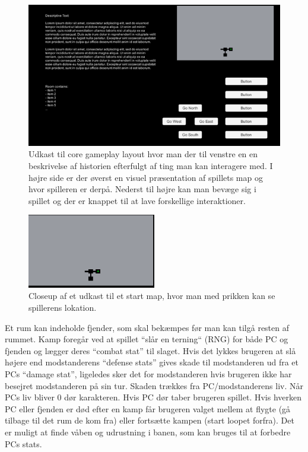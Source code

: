 \begin{figure}[H]
\centering
\includegraphics[width = \textwidth]{02-Body/Images/SpilLayout-udkast.png}
\caption{Udkast til core gameplay layout hvor man der til venstre en en beskrivelse af historien efterfulgt af ting man kan interagere med. I højre side er der øverst en visuel præsentation af spillets map og hvor spilleren er derpå. Nederst til højre kan man bevæge sig i spillet og der er knappet til at lave forskellige interaktioner.}
\label{fig:Core-Gameplay-Layout-udkast}
\end{figure}

\begin{figure}[H]
\centering
\includegraphics[width = 0.5\textwidth]{02-Body/Images/Map-closeup.png}
\caption{Closeup af et udkast til et start map, hvor man med prikken kan se spillerens lokation.}
\label{fig:Map-Layout-udkast}
\end{figure}

Et rum kan indeholde fjender, som skal bekæmpes før man kan tilgå resten af rummet. Kamp foregår ved at spillet “slår en terning“ (RNG) for både PC og fjenden og lægger deres “combat stat” til slaget. Hvis det lykkes brugeren at slå højere end modstanderens ``defense stats'' gives skade til modstanderen ud fra et PCs ``damage stat'', ligeledes sker det for modstanderen hvis brugeren ikke har besejret modstanderen på sin tur. Skaden trækkes fra PC/modstanderens liv. Når PCs liv bliver 0 dør karakteren. Hvis PC dør taber brugeren spillet. Hvis hverken PC eller fjenden er død efter en kamp får brugeren valget mellem at flygte (gå tilbage til det rum de kom fra) eller fortsætte kampen (start loopet forfra). 
Det er muligt at finde våben og udrustning i banen, som kan bruges til at forbedre PCs stats. 

